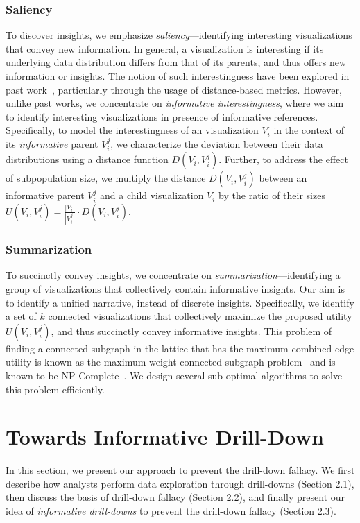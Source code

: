 \subsubsection{Saliency}
To discover insights, we emphasize \emph{saliency}---identifying interesting visualizations that convey new information. In general, a visualization is interesting if its underlying data distribution differs from that of its parents, and thus offers new information or insights. The notion of such interestingness have been explored in past work~\cite{Vartak2015,Correll2016,Itti2009}, particularly through the usage of distance-based metrics. However, unlike past works, we concentrate on \emph{informative interestingness}, where we aim to identify interesting visualizations in presence of informative references. Specifically, to model the interestingness of an visualization $V_i$ in the context of its \emph{informative} parent $V_i^j$, we characterize the deviation between their data distributions using a distance function $D(V_i, V_i^j)$. Further, to address the effect of subpopulation size, we multiply the distance $D(V_i, V_i^j)$ between an informative parent $V_i^j$ and a child visualization $V_i$ by the ratio of their sizes  $U(V_i, V_i^j) = \frac{|V_i|}{|V_i^{j}|} \cdot D(V_i, V_i^j)$.

\subsubsection{Summarization}
To succinctly convey insights, we concentrate on \emph{summarization}---identifying a group of visualizations that collectively contain informative insights. Our aim is to identify a unified narrative, instead of discrete insights. Specifically, we identify a set of $k$ connected visualizations that collectively maximize the proposed utility $U(V_i, V_i^j)$, and thus succinctly convey informative insights. This problem of finding a connected subgraph in the lattice that has the maximum combined edge utility is known as the maximum-weight connected subgraph problem~\cite{ErnstAlthaus2009} and is known to be NP-Complete~\cite{Parameswaran2010}. We design several sub-optimal algorithms to solve this problem efficiently. 

\iffalse
\section{Towards Informative Drill-Down\label{sec:datamodel}}
\par In this section, we present our approach to prevent the drill-down fallacy. We first describe how analysts perform data exploration through drill-downs (Section 2.1), then discuss the basis of drill-down fallacy (Section 2.2), and finally present our idea of \emph{informative drill-downs} to prevent the drill-down fallacy (Section 2.3).

